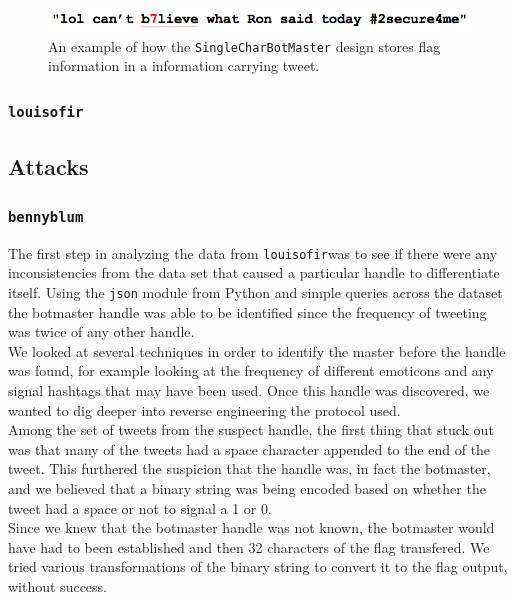 \documentclass[11pt, oneside]{article} %
\numberwithin{equation}{section} %
\numberwithin{figure}{section} %
\numberwithin{table}{section} %
\renewcommand{\c}[1]{\texttt{#1}}
\newcommand{\teambb}{\c{bennyblum}}
\newcommand{\teamol}{\c{louisofir}}
\begin{document}
		 \begin{figure}[H]
		    \center\includegraphics[scale=0.60]{resources/prng-tweet-ex.png}
		    \caption{An example of how the \c{SingleCharBotMaster} design stores flag information in a information carrying tweet.}
		    \label{fig:prng-tweet-ex}
		 \end{figure}
		
			
		\subsubsection{\teamol}

	\subsection{Attacks}
		\subsubsection{\teambb}
			The first step in analyzing the data from \teamol was to see if there were any inconsistencies from the data set that caused a particular handle to differentiate itself. Using the \c{json} module from Python and simple queries across the dataset the botmaster handle was able to be identified since the frequency of tweeting was twice of any other handle. \\

			We looked at several techniques in order to identify the master before the handle was found, for example looking at the frequency of different emoticons and any signal hashtags that may have been used. Once this handle was discovered, we wanted to dig deeper into reverse engineering the protocol used. \\

			Among the set of tweets from the suspect handle, the first thing that stuck out was that many of the tweets had a space character appended to the end of the tweet. This furthered the suspicion that the handle was, in fact the botmaster, and we believed that a binary string was being encoded based on whether the tweet had a space or not to signal a 1 or 0. \\

			Since we knew that the botmaster handle was not known, the botmaster would have had to been established and then 32 characters of the flag transfered. We tried various transformations of the binary string to convert it to the flag output, without success. 
\end{document}
